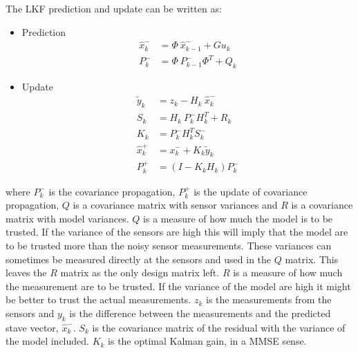 The \ac{LKF} prediction and update can be written as:
\begin{itemize}
\item Prediction
\begin{align}
\hat x_k^- &= \Phi\ \hat x_{k-1}^- + G u_k \\
P_k^- &= \Phi\ P_{k-1}^- \Phi^T + Q_{k}
\end{align}

\item Update
\begin{align}
\tilde y_k &= z_k - H_k\ \hat x_k^-\\
S_k &= H_k\ P_k^-H_k^T + R_k\\
K_k &= P_k^-H_k^TS_k^-\\
\hat x_k^+ &= x_k^- + K_k \tilde y_k\\
P_k^+ &= (I - K_k H_k) P_k^-
\end{align}
\end{itemize}
%
where $P_{k}^-$ is the covariance propagation, $P_{k}^+$ is the update of covariance propagation, $Q$ is a covariance matrix with sensor variances and $R$ is a covariance matrix with model variances. $Q$ is a measure of how much the model is to be trusted. If the variance of the sensors are high this will imply that the model are to be trusted more than the noisy sensor measurements. These variances can sometimes be measured directly at the sensors and used in the $Q$ matrix. This leaves the $R$ matrix as the only design matrix left. $R$ is a measure of how much the measurement are to be trusted. If the variance of the model are high it might be better to trust the actual measurements. $z_k$ is the measurements from the sensors and $y_k$ is the difference between the measurements and the predicted stave vector, $\hat x_k^-$. $S_k$ is the covariance matrix of the residual with the variance of the model included. $K_k$ is the optimal Kalman gain, in a MMSE sense. 

